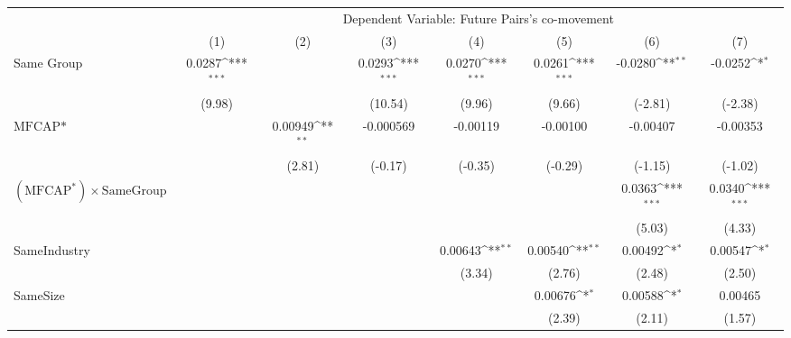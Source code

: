 {
\def\sym#1{\ifmmode^{#1}\else\(^{#1}\)\fi}
\begin{tabular}{l*{7}{c}}
\hline\hline
                &\multicolumn{7}{c}{Dependent Variable: Future Pairs's co-movement}                                                                  \\\cmidrule(lr){2-8}
                &\multicolumn{1}{c}{(1)}         &\multicolumn{1}{c}{(2)}         &\multicolumn{1}{c}{(3)}         &\multicolumn{1}{c}{(4)}         &\multicolumn{1}{c}{(5)}         &\multicolumn{1}{c}{(6)}         &\multicolumn{1}{c}{(7)}         \\
\hline
Same Group      &   0.0287\sym{***}&                  &   0.0293\sym{***}&   0.0270\sym{***}&   0.0261\sym{***}&  -0.0280\sym{**} &  -0.0252\sym{*}  \\
                &   (9.98)         &                  &  (10.54)         &   (9.96)         &   (9.66)         &  (-2.81)         &  (-2.38)         \\
[1em]
$ \text{MFCAP*} $&                  &  0.00949\sym{**} &-0.000569         & -0.00119         & -0.00100         & -0.00407         & -0.00353         \\
                &                  &   (2.81)         &  (-0.17)         &  (-0.35)         &  (-0.29)         &  (-1.15)         &  (-1.02)         \\
[1em]
 $ (\text{MFCAP}^*) \times {\text{SameGroup} }  $ &                  &                  &                  &                  &                  &   0.0363\sym{***}&   0.0340\sym{***}\\
                &                  &                  &                  &                  &                  &   (5.03)         &   (4.33)         \\
[1em]
SameIndustry    &                  &                  &                  &  0.00643\sym{**} &  0.00540\sym{**} &  0.00492\sym{*}  &  0.00547\sym{*}  \\
                &                  &                  &                  &   (3.34)         &   (2.76)         &   (2.48)         &   (2.50)         \\
[1em]
SameSize        &                  &                  &                  &                  &  0.00676\sym{*}  &  0.00588\sym{*}  &  0.00465         \\
                &                  &                  &                  &                  &   (2.39)         &   (2.11)         &   (1.57)         \\

\end{tabular}}
